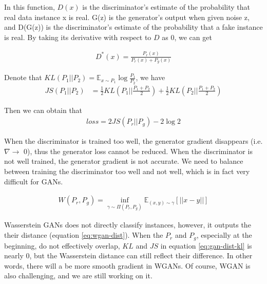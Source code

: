 \documentclass[a4paper,11pt]{article}
\begin{document}
In this function, $D(x)$ is the discriminator's estimate of the probability that real data instance x is real.
G(z) is the generator's output when given noise z, and D(G(z)) is the discriminator's estimate of the probability that a fake instance is real.
By taking its derivative with respect to $D$ as 0, we can get

\begin{equation}
    \begin{aligned}
    D^*(x) = \frac{P_r(x)}{P_r(x) + P_g(x)}
    \end{aligned}
\end{equation}

Denote that $KL(P_1||P_2) = \mathbb{E}_{x \sim P_1} \log \frac{P_1}{P_2}$, we have
\begin{equation}
    \begin{aligned}
    JS(P_1 || P_2) &= \frac{1}{2}KL(P_1||\frac{P_1 + P_2}{2}) + \frac{1}{2}KL(P_2||\frac{P_1 + P_2}{2})
    \end{aligned}
    \label{eq:gan-dist-kl}
\end{equation}

Then we can obtain that
\begin{equation}
    \begin{aligned}
    loss = 2JS(P_r || P_g) - 2\log 2
    \end{aligned}
\end{equation}

When the discriminator is trained too well, the generator gradient disappears (i.e. $\nabla \rightarrow$ 0), thus the generator loss cannot be reduced. When the discriminator is not well trained, the generator gradient is not accurate. We need to balance between training the discriminator too well and not well, which is in fact very difficult for GANs.

\begin{equation}
    \begin{aligned}
    W(P_r, P_g) = \inf_{\gamma \sim \Pi (P_r, P_g)} \mathbb{E}_{(x, y) \sim \gamma} [||x - y||]
    \end{aligned}
    \label{eq:wgan-dist}
\end{equation}

Wasserstein GANs does not directly classify instances, however, it outputs the their distance (equation \ref{eq:wgan-dist}). When the $P_r$ and $P_g$, especially at the beginning, do not effectively overlap, $KL$ and $JS$ in equation \ref{eq:gan-dist-kl} is nearly 0, but the Wasserstein distance can still reflect their difference. In other words, there will a be more smooth gradient in WGANs.
Of course, WGAN is also challenging, and we are still working on it.
\end{document}
